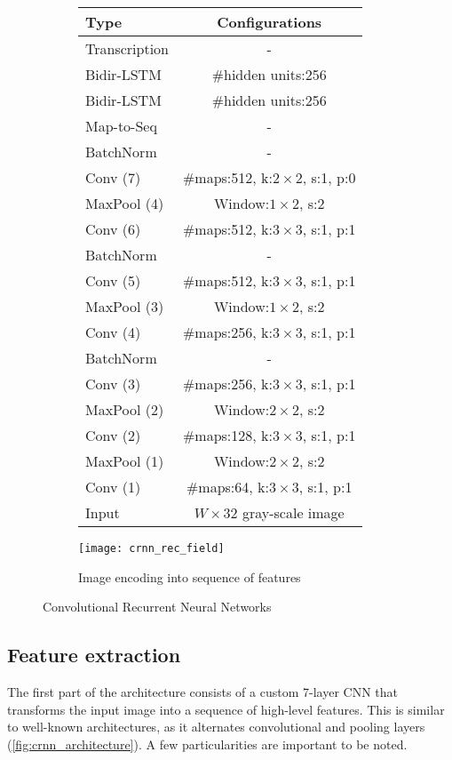 		\begin{figure}
		\begin{subfigure}[c]{.48\linewidth}
		\begin{flushleft}
		\footnotesize
		\begin{tabular}{|l|c|}
			\hline
			\textbf{Type} & \textbf{Configurations}						\tabularnewline	\hline
																																				\hline
			Transcription & - 																\tabularnewline	\hline
			Bidir-LSTM & \#hidden units:256						\tabularnewline	\hline
			Bidir-LSTM & \#hidden units:256						\tabularnewline	\hline
			Map-to-Seq & - 															\tabularnewline	\hline
			BatchNorm & - 														\tabularnewline	\hline
			Conv (7) & \#maps:512, k:$2\times2$, s:1, p:0	\tabularnewline	\hline
			MaxPool (4) & Window:$1\times2$, s:2								\tabularnewline	\hline
			Conv (6) & \#maps:512, k:$3\times3$, s:1, p:1	\tabularnewline	\hline
			BatchNorm & - 														\tabularnewline	\hline
			Conv (5) & \#maps:512, k:$3\times3$, s:1, p:1	\tabularnewline	\hline
			MaxPool (3) & Window:$1\times2$, s:2 							\tabularnewline	\hline
			Conv (4) & \#maps:256, k:$3\times3$, s:1, p:1	\tabularnewline	\hline
			BatchNorm & - 														\tabularnewline	\hline
			Conv (3) & \#maps:256, k:$3\times3$, s:1, p:1	\tabularnewline	\hline
			MaxPool (2) & Window:$2\times2$, s:2								\tabularnewline	\hline
			Conv (2) & \#maps:128, k:$3\times3$, s:1, p:1	\tabularnewline	\hline
			MaxPool (1) & Window:$2\times2$, s:2 							\tabularnewline	\hline
			Conv (1) & \#maps:64, k:$3\times3$, s:1, p:1		\tabularnewline	\hline
			Input & $W\times32$ gray-scale image 							\tabularnewline	\hline
		\end{tabular}\par
		\caption[\CRNN{} structure]{}\label{fig:crnn_architecture}
		\end{flushleft}
		\end{subfigure}
		\begin{subfigure}[c]{.49\linewidth}
			\texttt{[image: crnn\_rec\_field]}
			\caption{Image encoding into sequence of features \citep[credit to][]{CRNN}}\label{fig:crnn_sequence}
		\end{subfigure}
		\caption{Convolutional Recurrent Neural Networks}
		\end{figure}

	\subsection{Feature extraction}
		The first part of the \CRNN{} architecture consists of a custom 7-layer CNN that transforms the input image into a sequence of high-level features. This is similar to well-known architectures, as it alternates convolutional and pooling layers (\autoref{fig:crnn_architecture}). A few particularities are important to be noted.

